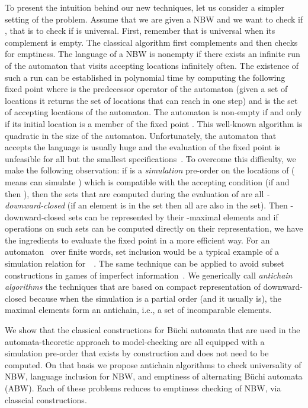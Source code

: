 \documentclass{LMCS}
\begin{document}
To present the intuition behind our new techniques, let us consider a
simpler setting of the problem. Assume that we
are given a NBW  and we want to check if , that is to check if  is universal.  First,
remember that  is universal when its complement  is empty.  The
classical algorithm first complements  and then checks for
emptiness. The language of a NBW is nonempty if there exists an
infinite run of the automaton that visits accepting locations
infinitely often.  The existence of such a run can be established
in polynomial time by computing the following fixed point  where  is the predecessor
operator of the automaton (given a set  of locations it returns the
set of locations that can reach  in one step) and  is the set
of accepting locations of the automaton. The automaton is non-empty if
and only if its initial location is a member of the fixed
point .  This well-known algorithm is quadratic in the size of the automaton.  
Unfortunately, the automaton that accepts the language  is usually 
huge and the evaluation of the fixed point is unfeasible for all but the smallest 
specifications~.  To overcome this difficulty, we make the following observation:
if  is a \emph{simulation} pre-order on the locations of  
( means  can simulate ) which is compatible with
the accepting condition (if  and 
then ), then the sets that are computed during the
evaluation of  are all \emph{-downward-closed} (if an element
 is in the set then all  are also in the set). Then
-downward-closed sets can be represented by their -maximal elements 
and if operations on such sets can be computed directly on their representation, 
we have the ingredients to evaluate the fixed point in a more efficient way.
For an automaton~ over finite words, set inclusion would be a typical example 
of a simulation relation for~~\cite{cav06}. The same technique can be applied
to avoid subset constructions in games of imperfect information~\cite{DDR06,CDHR07}.
We generically call \emph{antichain algorithms} the techniques that are based
on compact representation of downward-closed because when the simulation
is a partial order (and it usually is), the maximal elements form an antichain,
i.e., a set of incomparable elements.


We show that the classical constructions for B\"uchi automata that are
used in the automata-theoretic approach to model-checking are all
equipped with a simulation pre-order that exists by construction and
does not need to be computed. On that basis we propose antichain algorithms
to check universality of NBW, language inclusion for NBW, and
emptiness of alternating B\"uchi automata (ABW). Each of these problems
reduces to emptiness checking of NBW, via classcial constructions.
\end{document}
